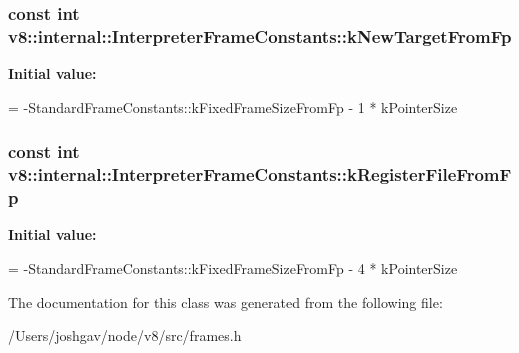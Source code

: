 \subsubsection[{\texorpdfstring{k\+New\+Target\+From\+Fp}{kNewTargetFromFp}}]{\setlength{\rightskip}{0pt plus 5cm}const int v8\+::internal\+::\+Interpreter\+Frame\+Constants\+::k\+New\+Target\+From\+Fp\hspace{0.3cm}{\ttfamily [static]}}\hypertarget{classv8_1_1internal_1_1_interpreter_frame_constants_ad888e20004c259557aefab79230dfbce}{}\label{classv8_1_1internal_1_1_interpreter_frame_constants_ad888e20004c259557aefab79230dfbce}
{\bfseries Initial value\+:}
\begin{DoxyCode}
=
      -StandardFrameConstants::kFixedFrameSizeFromFp - 1 * kPointerSize
\end{DoxyCode}
\subsubsection[{\texorpdfstring{k\+Register\+File\+From\+Fp}{kRegisterFileFromFp}}]{\setlength{\rightskip}{0pt plus 5cm}const int v8\+::internal\+::\+Interpreter\+Frame\+Constants\+::k\+Register\+File\+From\+Fp\hspace{0.3cm}{\ttfamily [static]}}\hypertarget{classv8_1_1internal_1_1_interpreter_frame_constants_a16644b8b63163b0f612e7850fa18833d}{}\label{classv8_1_1internal_1_1_interpreter_frame_constants_a16644b8b63163b0f612e7850fa18833d}
{\bfseries Initial value\+:}
\begin{DoxyCode}
=
      -StandardFrameConstants::kFixedFrameSizeFromFp - 4 * kPointerSize
\end{DoxyCode}


The documentation for this class was generated from the following file\+:\begin{DoxyCompactItemize}
\item 
/\+Users/joshgav/node/v8/src/frames.\+h\end{DoxyCompactItemize}
